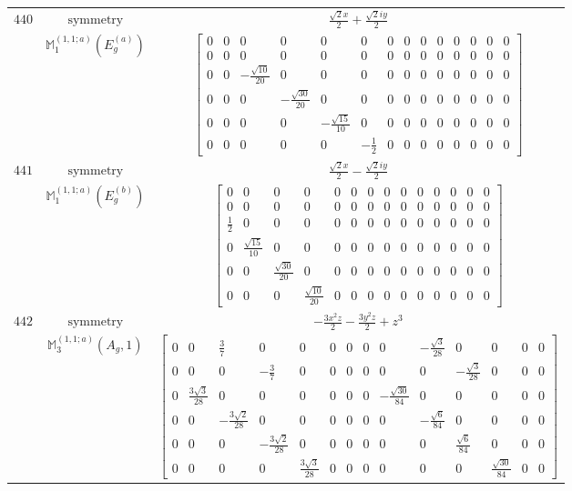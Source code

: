 \documentclass[fleqn,8pt,landscape]{jsarticle}
\begin{document}
\begin{longtable}{ccc}
$ 440 $ & $ \text{symmetry} $ & $ \frac{\sqrt{2} x}{2} + \frac{\sqrt{2} i y}{2} $ \\
$  $ & $ \mathbb{M}_{1}^{(1,1;a)}(E_{g}^{(a)}) $ & $ \begin{bmatrix} 0 & 0 & 0 & 0 & 0 & 0 & 0 & 0 & 0 & 0 & 0 & 0 & 0 & 0 \\ 0 & 0 & 0 & 0 & 0 & 0 & 0 & 0 & 0 & 0 & 0 & 0 & 0 & 0 \\ 0 & 0 & - \frac{\sqrt{10}}{20} & 0 & 0 & 0 & 0 & 0 & 0 & 0 & 0 & 0 & 0 & 0 \\ 0 & 0 & 0 & - \frac{\sqrt{30}}{20} & 0 & 0 & 0 & 0 & 0 & 0 & 0 & 0 & 0 & 0 \\ 0 & 0 & 0 & 0 & - \frac{\sqrt{15}}{10} & 0 & 0 & 0 & 0 & 0 & 0 & 0 & 0 & 0 \\ 0 & 0 & 0 & 0 & 0 & - \frac{1}{2} & 0 & 0 & 0 & 0 & 0 & 0 & 0 & 0 \end{bmatrix} $ \\ \hline
$ 441 $ & $ \text{symmetry} $ & $ \frac{\sqrt{2} x}{2} - \frac{\sqrt{2} i y}{2} $ \\
$  $ & $ \mathbb{M}_{1}^{(1,1;a)}(E_{g}^{(b)}) $ & $ \begin{bmatrix} 0 & 0 & 0 & 0 & 0 & 0 & 0 & 0 & 0 & 0 & 0 & 0 & 0 & 0 \\ 0 & 0 & 0 & 0 & 0 & 0 & 0 & 0 & 0 & 0 & 0 & 0 & 0 & 0 \\ \frac{1}{2} & 0 & 0 & 0 & 0 & 0 & 0 & 0 & 0 & 0 & 0 & 0 & 0 & 0 \\ 0 & \frac{\sqrt{15}}{10} & 0 & 0 & 0 & 0 & 0 & 0 & 0 & 0 & 0 & 0 & 0 & 0 \\ 0 & 0 & \frac{\sqrt{30}}{20} & 0 & 0 & 0 & 0 & 0 & 0 & 0 & 0 & 0 & 0 & 0 \\ 0 & 0 & 0 & \frac{\sqrt{10}}{20} & 0 & 0 & 0 & 0 & 0 & 0 & 0 & 0 & 0 & 0 \end{bmatrix} $ \\ \hline
$ 442 $ & $ \text{symmetry} $ & $ - \frac{3 x^{2} z}{2} - \frac{3 y^{2} z}{2} + z^{3} $ \\
$  $ & $ \mathbb{M}_{3}^{(1,1;a)}(A_{g},1) $ & $ \begin{bmatrix} 0 & 0 & \frac{3}{7} & 0 & 0 & 0 & 0 & 0 & 0 & - \frac{\sqrt{3}}{28} & 0 & 0 & 0 & 0 \\ 0 & 0 & 0 & - \frac{3}{7} & 0 & 0 & 0 & 0 & 0 & 0 & - \frac{\sqrt{3}}{28} & 0 & 0 & 0 \\ 0 & \frac{3 \sqrt{3}}{28} & 0 & 0 & 0 & 0 & 0 & 0 & - \frac{\sqrt{30}}{84} & 0 & 0 & 0 & 0 & 0 \\ 0 & 0 & - \frac{3 \sqrt{2}}{28} & 0 & 0 & 0 & 0 & 0 & 0 & - \frac{\sqrt{6}}{84} & 0 & 0 & 0 & 0 \\ 0 & 0 & 0 & - \frac{3 \sqrt{2}}{28} & 0 & 0 & 0 & 0 & 0 & 0 & \frac{\sqrt{6}}{84} & 0 & 0 & 0 \\ 0 & 0 & 0 & 0 & \frac{3 \sqrt{3}}{28} & 0 & 0 & 0 & 0 & 0 & 0 & \frac{\sqrt{30}}{84} & 0 & 0 \end{bmatrix} $ \\ \hline

\end{longtable}
\end{document}
